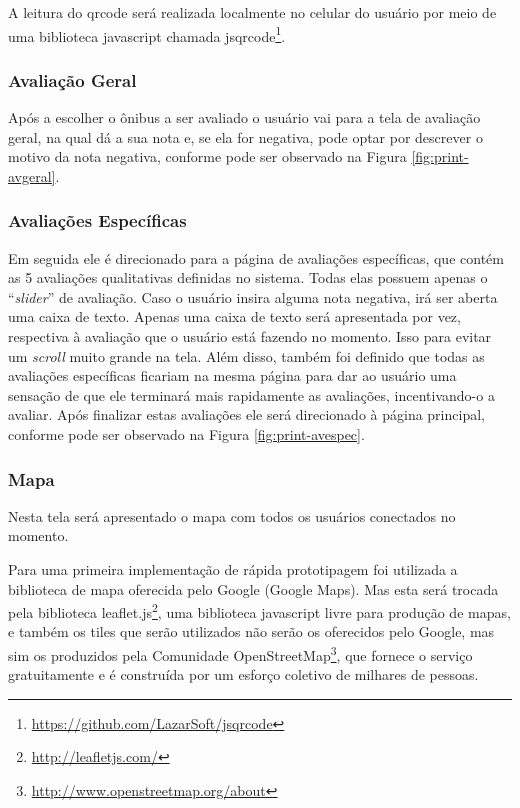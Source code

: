 A leitura do \gls{qrcode} será realizada localmente no celular do usuário por meio de uma biblioteca javascript chamada jsqrcode\footnote{\url{https://github.com/LazarSoft/jsqrcode}}.

\subsubsection{Avaliação Geral}
Após a escolher o ônibus a ser avaliado o usuário vai para a tela de avaliação geral, na qual dá a sua nota e, se ela for negativa, pode optar por descrever o motivo da nota negativa, conforme pode ser observado na Figura \ref{fig:print-avgeral}.
    
\subsubsection{Avaliações Específicas}
Em seguida ele é direcionado para a página de avaliações específicas, que contém as 5 avaliações qualitativas definidas no sistema. Todas elas possuem apenas o ``\textit{slider}'' de avaliação. Caso o usuário insira alguma nota negativa, irá ser aberta uma caixa de texto. Apenas uma caixa de texto será apresentada por vez, respectiva à avaliação que o usuário está fazendo no momento. Isso para evitar um \textit{scroll} muito grande na tela. Além disso, também foi definido que todas as avaliações específicas ficariam na mesma página para dar ao usuário uma sensação de que ele terminará mais rapidamente as avaliações, incentivando-o a avaliar. Após finalizar estas avaliações ele será direcionado à página principal, conforme pode ser observado na Figura \ref{fig:print-avespec}.
    
\subsubsection{Mapa}
Nesta tela será apresentado o mapa com todos os usuários conectados no momento.
    
Para uma primeira implementação de rápida prototipagem foi utilizada a biblioteca de mapa oferecida pelo Google (Google Maps). Mas esta será trocada pela biblioteca leaflet.js\footnote{\url{http://leafletjs.com/}}, uma biblioteca javascript livre para produção de mapas, e também os tiles que serão utilizados não serão os oferecidos pelo Google, mas sim os produzidos pela Comunidade OpenStreetMap\footnote{\url{http://www.openstreetmap.org/about}}, que fornece o serviço gratuitamente e é construída por um esforço coletivo de milhares de pessoas.
    
